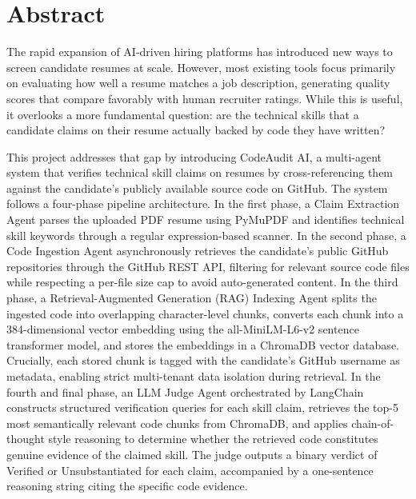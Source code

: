 \documentclass[12pt,a4paper]{report}
\begin{document}
\chapter*{Abstract}


The rapid expansion of AI-driven hiring platforms has introduced new ways to screen candidate resumes at scale. However, most existing tools focus primarily on evaluating how well a resume matches a job description, generating quality scores that compare favorably with human recruiter ratings. While this is useful, it overlooks a more fundamental question: are the technical skills that a candidate claims on their resume actually backed by code they have written?

This project addresses that gap by introducing CodeAudit AI, a multi-agent system that verifies technical skill claims on resumes by cross-referencing them against the candidate's publicly available source code on GitHub. The system follows a four-phase pipeline architecture. In the first phase, a Claim Extraction Agent parses the uploaded PDF resume using PyMuPDF and identifies technical skill keywords through a regular expression-based scanner. In the second phase, a Code Ingestion Agent asynchronously retrieves the candidate's public GitHub repositories through the GitHub REST API, filtering for relevant source code files while respecting a per-file size cap to avoid auto-generated content. In the third phase, a Retrieval-Augmented Generation (RAG) Indexing Agent splits the ingested code into overlapping character-level chunks, converts each chunk into a 384-dimensional vector embedding using the all-MiniLM-L6-v2 sentence transformer model, and stores the embeddings in a ChromaDB vector database. Crucially, each stored chunk is tagged with the candidate's GitHub username as metadata, enabling strict multi-tenant data isolation during retrieval. In the fourth and final phase, an LLM Judge Agent orchestrated by LangChain constructs structured verification queries for each skill claim, retrieves the top-5 most semantically relevant code chunks from ChromaDB, and applies chain-of-thought style reasoning to determine whether the retrieved code constitutes genuine evidence of the claimed skill. The judge outputs a binary verdict of Verified or Unsubstantiated for each claim, accompanied by a one-sentence reasoning string citing the specific code evidence.
\end{document}
